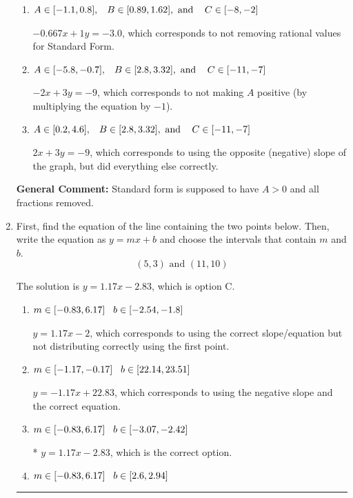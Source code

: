 \documentclass{extbook}[14pt]
\newcommand{\litem}[1]{\item #1

\rule{\textwidth}{0.4pt}}
\begin{document}
\begin{enumerate}
{\begin{enumerate}[label=\Alph*.]
* $2x - 3y = 9$, which is the correct option.
\item \( A \in [-1.1, 0.8], \hspace{3mm} B \in [0.89, 1.62], \text{ and } \hspace{3mm} C \in [-8, -2] \)

 $-0.667x + 1y = -3.0$, which corresponds to not removing rational values for Standard Form.
\item \( A \in [-5.8, -0.7], \hspace{3mm} B \in [2.8, 3.32], \text{ and } \hspace{3mm} C \in [-11, -7] \)

 $-2x + 3y = -9$, which corresponds to not making $A$ positive (by multiplying the equation by $-1$).
\item \( A \in [0.2, 4.6], \hspace{3mm} B \in [2.8, 3.32], \text{ and } \hspace{3mm} C \in [-11, -7] \)

 $2x + 3y = -9$, which corresponds to using the opposite (negative) slope of the graph, but did everything else correctly.
\end{enumerate}

\textbf{General Comment:} Standard form is supposed to have $A > 0$ and all fractions removed.
}
\litem{
First, find the equation of the line containing the two points below. Then, write the equation as $ y=mx+b $ and choose the intervals that contain $m$ and $b$.
\[ (5, 3) \text{ and } (11, 10) \]

The solution is \( y = 1.17x -2.83 \), which is option C.\begin{enumerate}[label=\Alph*.]
\item \( m \in [-0.83, 6.17] \hspace*{3mm} b \in [-2.54, -1.8] \)

 $y = 1.17x -2$, which corresponds to using the correct slope/equation but not distributing correctly using the first point.
\item \( m \in [-1.17, -0.17] \hspace*{3mm} b \in [22.14, 23.51] \)

 $y = -1.17x + 22.83$, which corresponds to using the negative slope and the correct equation.
\item \( m \in [-0.83, 6.17] \hspace*{3mm} b \in [-3.07, -2.42] \)

* $y = 1.17x -2.83$, which is the correct option.
\item \( m \in [-0.83, 6.17] \hspace*{3mm} b \in [2.6, 2.94] \)


\end{enumerate}}
\end{enumerate}
\end{document}

